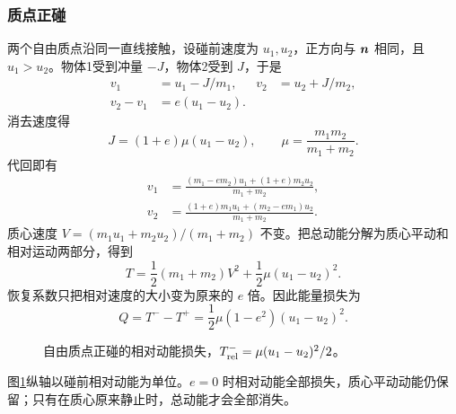 \subsubsection{质点正碰}
两个自由质点沿同一直线接触，设碰前速度为 $u_1,u_2$，正方向与 $\bm{n}$ 相同，且 $u_1>u_2$。物体1受到冲量 $-J$，物体2受到 $J$，于是
\begin{align}
 v_1&=u_1-J/m_1,&v_2&=u_2+J/m_2,\\
 v_2-v_1&=e(u_1-u_2).
\end{align}
消去速度得
\begin{equation}\label{sup5:eq:d4-Jpoint}
 J=(1+e)\mu(u_1-u_2),\qquad
 \mu=\frac{m_1m_2}{m_1+m_2}.
\end{equation}
代回即有
\begin{align}\label{sup5:eq:d4-vpoint}
 v_1&=\frac{(m_1-em_2)u_1+(1+e)m_2u_2}{m_1+m_2},\\
 v_2&=\frac{(1+e)m_1u_1+(m_2-em_1)u_2}{m_1+m_2}.
\end{align}
质心速度 $V=(m_1u_1+m_2u_2)/(m_1+m_2)$ 不变。把总动能分解为质心平动和相对运动两部分，得到
\begin{equation}
 T=\frac12(m_1+m_2)V^2+\frac12\mu(u_1-u_2)^2.
\end{equation}
恢复系数只把相对速度的大小变为原来的 $e$ 倍。因此能量损失为
\begin{equation}\label{sup5:eq:d4-loss}
 Q=T^--T^+=\frac12\mu(1-e^2)(u_1-u_2)^2.
\end{equation}

\begin{figure}[H]\centering
{}
\caption{自由质点正碰的相对动能损失，$T_{\rm rel}^-=\mu(u_1-u_2)^2/2$。}\label{sup5:fig:d4-t2}
\end{figure}

图\ref{sup5:fig:d4-t2}纵轴以碰前相对动能为单位。$e=0$ 时相对动能全部损失，质心平动动能仍保留；只有在质心原来静止时，总动能才会全部消失。

